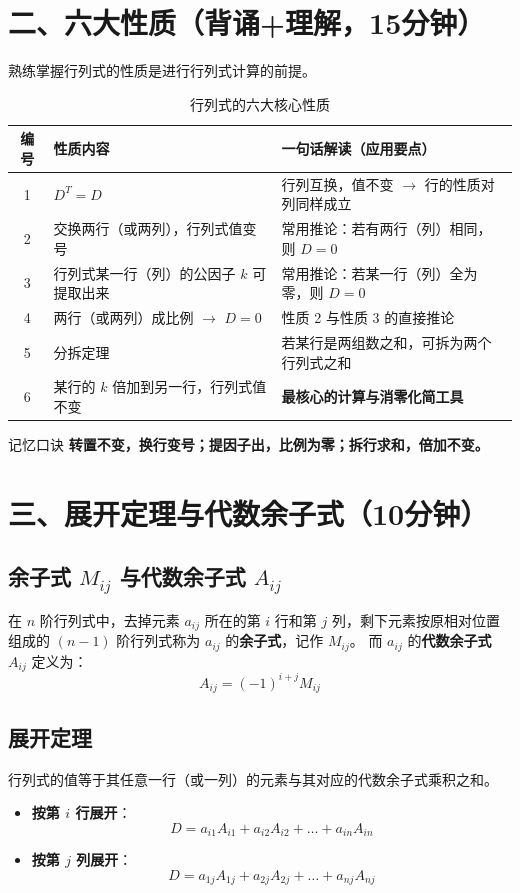 \documentclass{ctexart}
\begin{document}
\newpage

\section{二、六大性质（背诵+理解，15分钟）}
熟练掌握行列式的性质是进行行列式计算的前提。

\begin{table}[htbp]
\centering
\caption{行列式的六大核心性质}
\label{tab:properties}
\begin{tabular}{cll}
\toprule
\textbf{编号} & \textbf{性质内容} & \textbf{一句话解读（应用要点）} \\
\midrule
1 & $D^T = D$ & 行列互换，值不变 $\to$ 行的性质对列同样成立 \\
2 & 交换两行（或两列），行列式值变号 & 常用推论：若有两行（列）相同，则 $D=0$ \\
3 & 行列式某一行（列）的公因子 $k$ 可提取出来 & 常用推论：若某一行（列）全为零，则 $D=0$ \\
4 & 两行（或两列）成比例 $\to$ $D=0$ & 性质 2 与性质 3 的直接推论 \\
5 & 分拆定理 & 若某行是两组数之和，可拆为两个行列式之和 \\
6 & 某行的 $k$ 倍加到另一行，行列式值不变 & \textbf{最核心的计算与消零化简工具} \\
\bottomrule
\end{tabular}
\end{table}

\begin{cardbox}{记忆口诀}
  \centering\bfseries
  转置不变，换行变号；提因子出，比例为零；拆行求和，倍加不变。
\end{cardbox}

\section{三、展开定理与代数余子式（10分钟）}

\subsection{余子式 $M_{ij}$ 与代数余子式 $A_{ij}$}
在 $n$ 阶行列式中，去掉元素 $a_{ij}$ 所在的第 $i$ 行和第 $j$ 列，剩下元素按原相对位置组成的 $(n-1)$ 阶行列式称为 $a_{ij}$ 的\textbf{余子式}，记作 $M_{ij}$。
而 $a_{ij}$ 的\textbf{代数余子式} $A_{ij}$ 定义为：
\[
A_{ij} = (-1)^{i+j} M_{ij}
\]

\subsection{展开定理}
行列式的值等于其任意一行（或一列）的元素与其对应的代数余子式乘积之和。
\begin{itemize}
  \item \textbf{按第 $i$ 行展开}：
    \[
    D = a_{i1}A_{i1} + a_{i2}A_{i2} + \dots + a_{in}A_{in}
    \]
  \item \textbf{按第 $j$ 列展开}：
    \[
    D = a_{1j}A_{1j} + a_{2j}A_{2j} + \dots + a_{nj}A_{nj}
    \]
\end{itemize}
\end{document}
